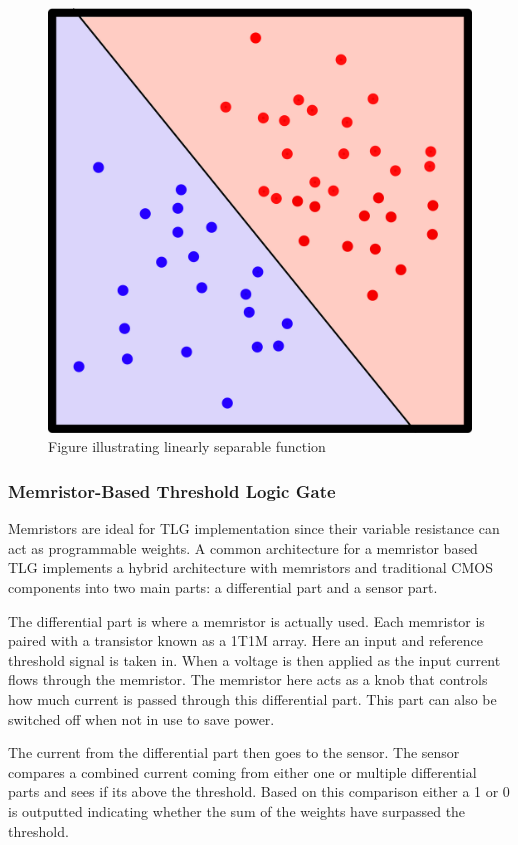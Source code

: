 \documentclass[sigconf]{acmart}
\begin{document}
\begin{figure}
  \centering
  \includegraphics[width = \linewidth]{images/Linearly_separable_red-blue_cropped_.svg.png}
  \caption{Figure illustrating linearly separable function}
\end{figure}

\subsubsection{Memristor-Based Threshold Logic Gate}
Memristors are ideal for TLG implementation since their variable 
resistance can act as programmable weights. A common architecture
for a memristor based TLG implements a hybrid architecture with 
memristors and traditional CMOS components into two main parts:
a differential part and a sensor part. 

The differential part is where a memristor is actually used. Each 
memristor is paired with a transistor known as a 1T1M array.
Here an input and reference threshold signal is taken in. When a 
voltage is then applied as the input current flows through the
memristor. The memristor here acts as a knob that controls how much 
current is passed through this differential part. This part 
can also be switched off when not in use to save power. 

The current from the differential part then goes to the sensor. 
The sensor compares a combined current coming from either one or 
multiple differential parts and sees if its above the threshold. 
Based on this comparison either a 1 or 0 is outputted indicating 
whether the sum of the weights have surpassed the threshold. 
\cite{papandroulidakis2019practical}
\end{document}
